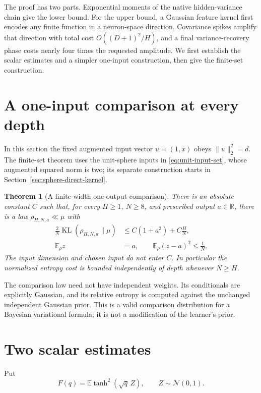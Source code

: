 \documentclass[11pt]{article}
\newtheorem{theorem}{Theorem}[section]\newtheorem{lemma}[theorem]{Lemma}\newtheorem{corollary}[theorem]{Corollary}\newtheorem{proposition}[theorem]{Proposition}
\newcommand{\E}{\mathbb E}\newcommand{\R}{\mathbb R}\newcommand{\KL}{\operatorname{KL}}
\begin{document}
The proof has two parts. Exponential moments of the native hidden-variance chain give the lower bound. For the upper bound, a Gaussian feature kernel first encodes any finite function in a neuron-space direction. Covariance spikes amplify that direction with total cost $O((D+1)^2/H)$, and a final variance-recovery phase costs nearly four times the requested amplitude. We first establish the scalar estimates and a simpler one-input construction, then give the finite-set construction.

\section{A one-input comparison at every depth}
In this section the fixed augmented input vector $u=(1,x)$ obeys $\|u\|_2^2=d$. The finite-set theorem uses the unit-sphere inputs in \eqref{eq:unit-input-set}, whose augmented squared norm is two; its separate construction starts in Section~\ref{sec:sphere-direct-kernel}.
\begin{theorem}[A finite-width one-output comparison]
\label{thm:main}
There is an absolute constant $C$ such that, for every $H\ge1$, $N\ge8$, and prescribed output $a\in\R$, there is a law $\rho_{H,N,a}\ll\mu$ with
\begin{align}
 \frac2N\KL(\rho_{H,N,a}\|\mu)&\le C(1+a^2)+C\frac HN,\label{eq:entropy}\\
 \E_\rho z&=a,\qquad \E_\rho(z-a)^2\le\frac1N.\label{eq:error}
\end{align}
The input dimension and chosen input do not enter $C$. In particular the normalized entropy cost is bounded independently of depth whenever $N\ge H$.
\end{theorem}

The comparison law need not have independent weights. Its conditionals are explicitly Gaussian, and its relative entropy is computed against the unchanged independent Gaussian prior. This is a valid comparison distribution for a Bayesian variational formula; it is not a modification of the learner's prior.

\section{Two scalar estimates}
Put
\[
 F(q)=\E\tanh^2(\sqrt q\,Z),\qquad Z\sim\mathcal N(0,1).
\]
\end{document}

